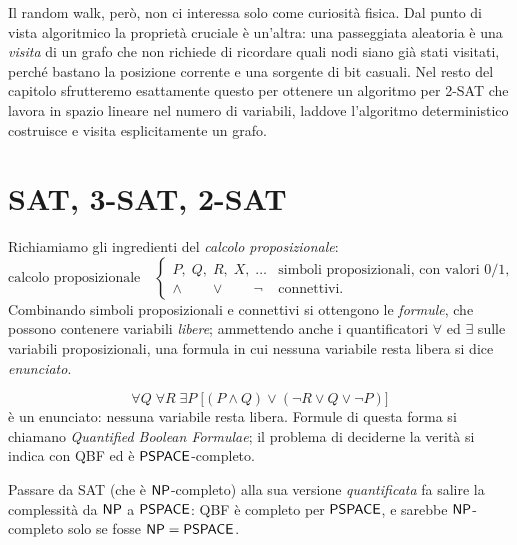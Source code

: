 Il random walk, però, non ci interessa solo come curiosità fisica. Dal punto di vista
algoritmico la proprietà cruciale è un'altra: una passeggiata aleatoria è una \emph{visita} di
un grafo che non richiede di ricordare quali nodi siano già stati visitati, perché bastano la
posizione corrente e una sorgente di bit casuali. Nel resto del capitolo sfrutteremo
esattamente questo per ottenere un algoritmo per 2-SAT che lavora in spazio lineare nel numero
di variabili, laddove l'algoritmo deterministico costruisce e visita esplicitamente un grafo.

\section{SAT, 3-SAT, 2-SAT}

Richiamiamo gli ingredienti del \emph{calcolo proposizionale}:
\[
\text{calcolo proposizionale}\quad
\begin{cases}
P,\; Q,\; R,\; X,\;\dots & \text{simboli proposizionali, con valori } 0/1,\\[6pt]
\wedge \qquad \vee \qquad \neg & \text{connettivi.}
\end{cases}
\]
Combinando simboli proposizionali e connettivi si ottengono le \emph{formule}, che possono
contenere variabili \emph{libere}; ammettendo anche i quantificatori $\forall$ ed $\exists$
sulle variabili proposizionali, una formula in cui nessuna variabile resta libera si dice
\emph{enunciato}.

\begin{esempio*}
\[
\forall Q\;\forall R\;\exists P\;\bigl[(P\wedge Q)\vee(\neg R\vee Q\vee\neg P)\bigr]
\]
è un enunciato: nessuna variabile resta libera. Formule di questa forma si chiamano
\emph{Quantified Boolean Formulae}; il problema di deciderne la verità si indica con QBF ed è
$\mathsf{PSPACE}$-completo.
\end{esempio*}

\begin{osservazione}
Passare da SAT (che è $\mathsf{NP}$-completo) alla sua versione \emph{quantificata} fa salire la
complessità da $\mathsf{NP}$ a $\mathsf{PSPACE}$: QBF è completo per $\mathsf{PSPACE}$, e sarebbe $\mathsf{NP}$-completo solo
se fosse $\mathsf{NP} = \mathsf{PSPACE}$.
\end{osservazione}

